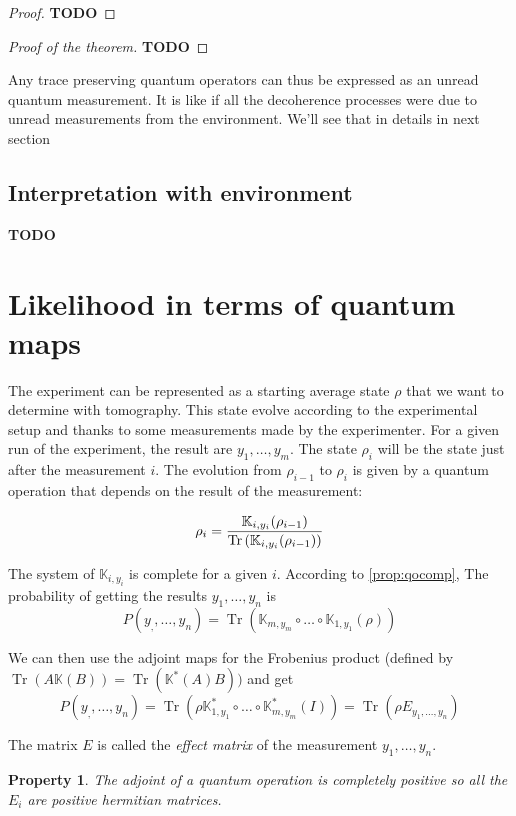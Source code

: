 \documentclass[10pt]{report}
\theoremstyle{plain}
\newtheorem{prop}[thm]{Property}
\theoremstyle{definition}
\theoremstyle{remark}
\newcommand{\TODO}{\textbf{TODO}}
\DeclareMathOperator{\Tr}{Tr}
\begin{document}
\begin{proof}
  \TODO{}
\end{proof}

\begin{proof}[Proof of the theorem]
  \TODO{}
\end{proof}

Any trace preserving quantum operators can thus be expressed as an unread
quantum measurement. It is like if all the decoherence processes were due to unread
measurements from the environment. We'll see that in details in next section

\subsection{Interpretation with environment}\label{ssec:interp}

\TODO{}

\section{Likelihood in terms of quantum maps}

The experiment can be represented as a starting average state $\rho$ that we
want to determine with tomography. This state evolve according to the
experimental setup and thanks to some measurements made by the experimenter. For
a given run of the experiment, the result are $y_1,\ldots,y_m$.
The state $\rho_i$ will be the state just after the measurement $i$. The
evolution from $\rho_{i-1}$ to $\rho_i$ is given by a quantum operation that
depends on the result of the measurement:

\[\rho_i = \trnorm{\mathbb K_{i,y_i}(\rho_{i-1})}\]

The system of $\mathbb K_{i,y_i}$ is complete for a given $i$. According to
\cref{prop:qocomp}, The probability of getting the results $y_1, \ldots, y_n$ is
\[P(y_,,\ldots, y_n) = \Tr(\mathbb K_{m,y_m} \circ \ldots \circ \mathbb K_{1,y_1}(\rho))\]

We can then use the adjoint maps for the Frobenius product (defined by $\Tr(A\mathbb K(B)) = \Tr(\mathbb
K^*(A)B))$ and get
\[P(y_,,\ldots, y_n) = \Tr(\rho \mathbb K_{1,y_1}^* \circ \ldots \circ \mathbb
  K_{m,y_m}^*(I)) = \Tr(\rho E_{y_1,\ldots, y_n})\]

The matrix $E$ is called the \emph{effect matrix} of the measurement
$y_1,\ldots,y_n$.

\begin{prop}
  The adjoint of a quantum operation is completely positive so all the $E_i$ are
  positive hermitian matrices.
\end{prop}
\end{document}
